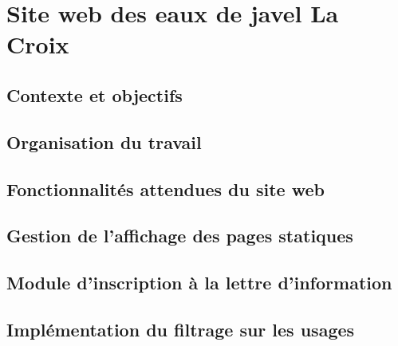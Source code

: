 \section{Site web des eaux de javel La Croix}

\subsection{Contexte et objectifs}

\subsection{Organisation du travail}

\subsection{Fonctionnalités attendues du site web}

\subsection{Gestion de l'affichage des pages statiques}

\subsection{Module d'inscription à la lettre d'information}

\subsection{Implémentation du filtrage sur les usages}
